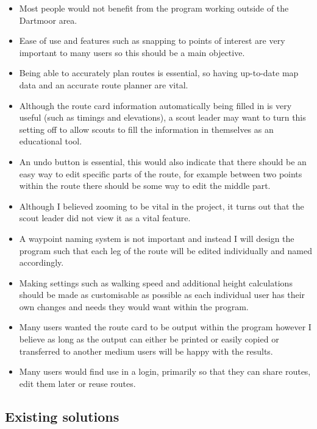 \documentclass{article}
\begin{document}
            \begin{itemize}
                \item Most people would not benefit from the program working outside of the Dartmoor area.
                \item Ease of use and features such as snapping to points of interest are very important to many users so this should be a main objective.
                \item Being able to accurately plan routes is essential, so having up-to-date map data and an accurate route planner are vital.
                \item Although the route card information automatically being filled in is very useful (such as timings and elevations), a scout leader may want to turn this setting off to allow scouts to fill the information in themselves as an educational tool.
                \item An undo button is essential, this would also indicate that there should be an easy way to edit specific parts of the route, for example between two points within the route there should be some way to edit the middle part.
                \item Although I believed zooming to be vital in the project, it turns out that the scout leader did not view it as a vital feature. 
                \item A waypoint naming system is not important and instead I will design the program such that each leg of the route will be edited individually and named accordingly.
                \item Making settings such as walking speed and additional height calculations should be made as customisable as possible as each individual user has their own changes and needs they would want within the program.
                \item Many users wanted the route card to be output within the program however I believe as long as the output can either be printed or easily copied or transferred to another medium users will be happy with the results.
                \item Many users would find use in a login, primarily so that they can share routes, edit them later or reuse routes.
            \end{itemize}

    \subsection{Existing solutions}
\end{document}
